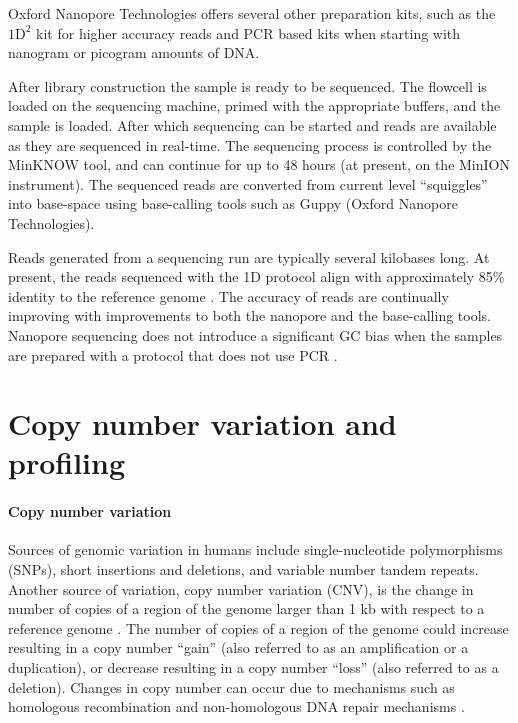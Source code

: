 Oxford Nanopore Technologies offers several other preparation kits, such
as the $\text{1D}^2$ kit for higher accuracy reads and PCR based kits when
starting with nanogram or picogram amounts of DNA.

After library construction the sample is ready to be sequenced. The
flowcell is loaded on the sequencing machine, primed with the
appropriate buffers, and the sample is loaded. After which sequencing
can be started and reads are available as they are sequenced in
real-time.
%
The sequencing process is controlled by the MinKNOW tool, and can
continue for up to 48 hours (at present, on the MinION instrument).
The sequenced reads are converted from current level ``squiggles'' into
base-space using base-calling tools such as Guppy (Oxford Nanopore
Technologies).

Reads generated from a sequencing run are typically several kilobases
long.
At present, the reads sequenced with the 1D protocol align with
approximately 85\% identity to the reference genome
\citep{bowden2019sequencing,jain2018nanopore,carter2017robust}.  The
accuracy of reads are continually improving with improvements to both
the nanopore and the base-calling tools.
Nanopore sequencing does not introduce a significant GC bias when the
samples are prepared with a protocol that does not use PCR
\citep{carter2017robust}.


\section{Copy number variation and profiling}
\paragraph{Copy number variation}
Sources of genomic variation in humans include single-nucleotide
polymorphisms (SNPs), short insertions and deletions, and variable
number tandem repeats.
Another source of variation, copy number variation (CNV), is the change
in number of copies of a region of the genome larger than 1 kb with
respect to a reference genome
\citep{redon2006global,feuk2006structural}.  The number of copies of a
region of the genome could increase resulting in a copy number ``gain''
(also referred to as an amplification or a duplication), or decrease
resulting in a copy number ``loss'' (also referred to as a deletion).
Changes in copy number can occur due to mechanisms such as homologous
recombination and non-homologous DNA repair mechanisms
\citep{hastings2009mechanisms,van2011origins,stankiewicz2010structural}.

